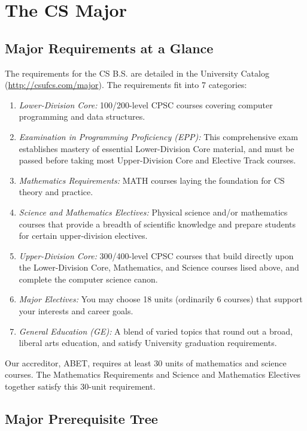\documentclass{book}
\newcommand{\shrunkurl}[1]{\url{http://csufcs.com/#1}}
\begin{document}
\chapter{The CS Major}

\section{Major Requirements at a Glance}

The requirements for the CS B.S. are detailed in the University
Catalog (\shrunkurl{major}). The requirements fit into 7 categories:
\begin{enumerate}
\item \emph{Lower-Division Core:} 100/200-level CPSC courses covering
  computer programming and data structures.
\item \emph{Examination in Programming Proficiency (EPP):} This
  comprehensive exam establishes mastery of essential Lower-Division
  Core material, and must be passed before taking most Upper-Division
  Core and Elective Track courses.
\item \emph{Mathematics Requirements:} MATH courses laying the
  foundation for CS theory and practice.
\item \emph{Science and Mathematics Electives:} Physical science
  and/or mathematics courses that provide a breadth of scientific
  knowledge and prepare students for certain upper-division electives.
\item \emph{Upper-Division Core:} 300/400-level CPSC courses that
  build directly upon the Lower-Division Core, Mathematics, and
  Science courses lised above, and complete the computer science
  canon.
\item \emph{Major Electives:} You may choose 18 units (ordinarily 6
  courses) that support your interests and career goals.
\item \emph{General Education (GE):} A blend of varied topics that
  round out a broad, liberal arts education, and satisfy University
  graduation requirements.
\end{enumerate}
  
Our accreditor, ABET, requires at least 30 units of
mathematics and science courses. The Mathematics Requirements and
Science and Mathematics Electives together satisfy this 30-unit
requirement.

\section{Major Prerequisite Tree}
\label{section:major_prerequisite_tree}
\end{document}
